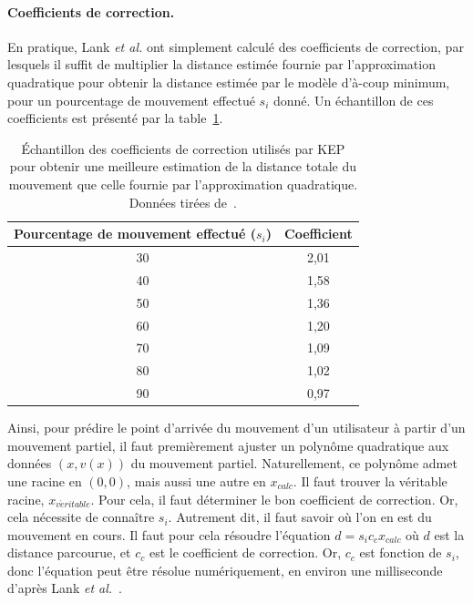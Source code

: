 \begin{appendices}
	
	\paragraph{Coefficients de correction.}
	En pratique, Lank \emph{et al.} ont simplement calculé des coefficients de correction, par lesquels il suffit de multiplier la distance estimée fournie par l'approximation quadratique pour obtenir la distance estimée par le modèle d'à-coup minimum, pour un pourcentage de mouvement effectué $s_{i}$ donné. Un échantillon de ces coefficients est présenté par la table~\ref{tab:kepCoeffs}.
	
	\begin{table}
	\centering
	\begin{tabular}{c c}
		Pourcentage de mouvement effectué ($s_{i}$)	& Coefficient	\bigstrut[b] \\ \hline
		30												& 2,01			\bigstrut[t] \\
		40												& 1,58			\\
		50												& 1,36			\\
		60												& 1,20			\\
		70												& 1,09			\\
		80												& 1,02			\\
		90												& 0,97			\\		
	\end{tabular}
	\caption[KEP -- coefficients de correction]{Échantillon des coefficients de correction utilisés par KEP pour obtenir une meilleure estimation de la distance totale du mouvement que celle fournie par l'approximation quadratique. Données tirées de~\cite{lank2007endpoint}.}
	\label{tab:kepCoeffs}
	\end{table}
	
	Ainsi, pour prédire le point d'arrivée du mouvement d'un utilisateur à partir d'un mouvement partiel, il faut premièrement ajuster un polynôme quadratique aux données $(x, v(x))$ du mouvement partiel. Naturellement, ce polynôme admet une racine en $(0,0)$, mais aussi une autre en $x_{calc}$. Il faut trouver la véritable racine, $x_{v\acute{e}ritable}$. Pour cela, il faut déterminer le bon coefficient de correction. Or, cela nécessite de connaître $s_{i}$. Autrement dit, il faut savoir où l'on en est du mouvement en cours. Il faut pour cela résoudre l'équation $d = s_{i}c_{c}x_{calc}$ où $d$ est la distance parcourue, et $c_{c}$ est le coefficient de correction. Or, $c_{c}$ est fonction de $s_{i}$, donc l'équation peut être résolue numériquement, en environ une milliseconde d'après Lank \emph{et al.}~\cite{lank2007endpoint}.
	

\end{appendices}
